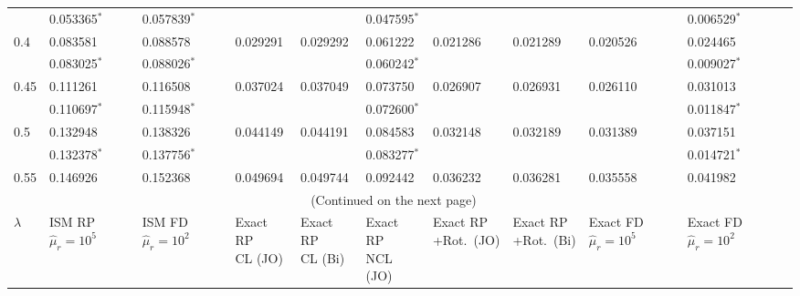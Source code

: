 \documentclass[../thesis.tex]{subfiles}
\begin{document}
\begin{landscape}
\begin{longtable}{lllllllllll}
 \\
 & 0.053365$^*$ & 0.057839$^*$ & & & 0.047595$^*$ & & & & 0.006529$^*$
 \\
 0.4 & 0.083581 & 0.088578 & 0.029291 & 0.029292 & 0.061222 & 0.021286 & 0.021289 & 0.020526 & 0.024465
 \\
 & 0.083025$^*$ & 0.088026$^*$ & & & 0.060242$^*$ & & & & 0.009027$^*$
 \\
 0.45 & 0.111261 & 0.116508 & 0.037024 & 0.037049 & 0.073750 & 0.026907 & 0.026931 & 0.026110 & 0.031013
 \\
 & 0.110697$^*$ & 0.115948$^*$ & & & 0.072600$^*$ & & & & 0.011847$^*$
 \\
 0.5 & 0.132948 & 0.138326 & 0.044149 & 0.044191 & 0.084583 & 0.032148 & 0.032189 & 0.031389 & 0.037151
 \\
 & 0.132378$^*$ & 0.137756$^*$ & & & 0.083277$^*$ & & & & 0.014721$^*$
 \\
 0.55 & 0.146926 & 0.152368 & 0.049694 & 0.049744 & 0.092442 & 0.036232 & 0.036281 & 0.035558 & 0.041982

 \\ \hline \multicolumn{10}{c}{(Continued on the next page)}
 \\ \newpage \hline $\lambda$ & \makecell[l]{ISM RP\\$\hat{\mu}_r=10^5$} & \makecell[l]{ISM FD\\$\hat{\mu}_r=10^2$} & \makecell[l]{Exact RP\\CL (JO)} & \makecell[l]{Exact RP\\CL (Bi)} & \makecell[l]{Exact RP\\NCL (JO)} & \makecell[l]{Exact RP\\+Rot.\ (JO)} & \makecell[l]{Exact RP\\+Rot.\ (Bi)} & \makecell[l]{Exact FD\\$\hat{\mu}_r=10^5$} & \makecell[l]{Exact FD\\$\hat{\mu}_r=10^2$}
 \\\hline


\end{longtable}
\end{landscape}
\end{document}
